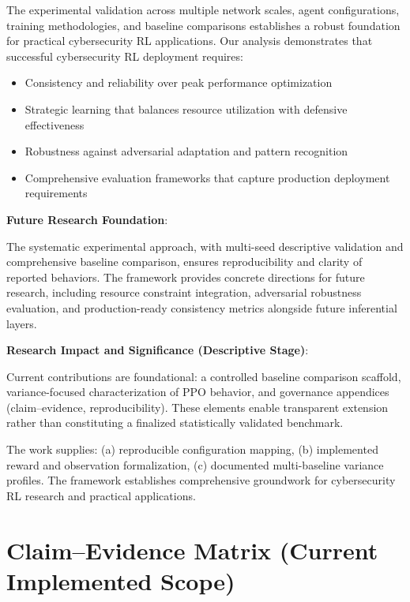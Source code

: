 \documentclass[12pt]{article}
\theoremstyle{definition}
\theoremstyle{plain}
\begin{document}
The experimental validation across multiple network scales, agent configurations, training methodologies, and baseline comparisons establishes a robust foundation for practical cybersecurity RL applications. Our analysis demonstrates that successful cybersecurity RL deployment requires:
\begin{itemize}
\item Consistency and reliability over peak performance optimization
\item Strategic learning that balances resource utilization with defensive effectiveness
\item Robustness against adversarial adaptation and pattern recognition
\item Comprehensive evaluation frameworks that capture production deployment requirements
\end{itemize}

\textbf{Future Research Foundation}:

The systematic experimental approach, with multi-seed descriptive validation and comprehensive baseline comparison, ensures reproducibility and clarity of reported behaviors. The framework provides concrete directions for future research, including resource constraint integration, adversarial robustness evaluation, and production-ready consistency metrics alongside future inferential layers.

	\textbf{Research Impact and Significance (Descriptive Stage)}:

Current contributions are foundational: a controlled baseline comparison scaffold, variance-focused characterization of PPO behavior, and governance appendices (claim–evidence, reproducibility). These elements enable transparent extension rather than constituting a finalized statistically validated benchmark.

The work supplies: (a) reproducible configuration mapping, (b) implemented reward and observation formalization, (c) documented multi-baseline variance profiles. The framework establishes comprehensive groundwork for cybersecurity RL research and practical applications.


\appendix

\section{Claim--Evidence Matrix (Current Implemented Scope)}
\end{document}

